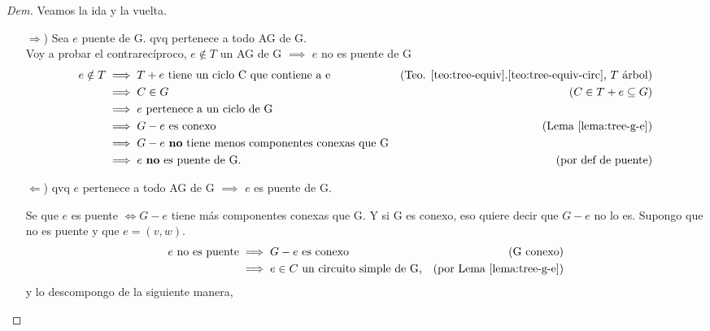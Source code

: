 \documentclass[12pt, a4paper]{report}
\theoremstyle{definition} %
\begin{document}
\begin{proof}[Dem]
    Veamos la ida y la vuelta.

    \begin{enumerate}
        \item[$\Rightarrow$)] Sea $e$ puente de G. qvq pertenece a todo AG de G.\\
         
        Voy a probar el contrarecíproco, $e \notin T$ un AG de G $\implies$ $e$ no es puente de G
        \begin{align*}
            e \notin T &\implies T+e\ \text{tiene un ciclo C que contiene a e} & \text{(Teo. \ref{teo:tree-equiv}.\ref{teo:tree-equiv-circ}, $T$ árbol)}\\
            &\implies C \in G &(C \in T+e \subseteq G)\\
            &\implies e \text{ pertenece a un ciclo de G}\\
            &\implies G - e \text{ es conexo} &\text{(Lema \ref{lema:tree-g-e})}\\
            &\implies G - e \text{ \textbf{no} tiene menos componentes conexas que G}\\
            &\implies e \text{ \textbf{no} es puente de G.} &\text{(por def de puente)}
        \end{align*}

        \item[$\Leftarrow$)] qvq $e$ pertenece a todo AG de G $\implies$ $e$ es puente de G.
         
        Se que $e$ es puente $\iff G - e$ tiene más componentes conexas que G. Y si G es conexo, eso quiere decir que $G - e$ no lo es. Supongo que no es puente y que $e = (v, w)$.
        \begin{align*}
            e\ \text{no es puente} &\implies G - e\ \text{es conexo}    & (\text{G conexo})\\
            &\implies e \in C\ \text{un circuito simple de G,} & (\text{por Lema \ref{lema:tree-g-e}})
        \end{align*}
        y lo descompongo de la siguiente manera,

        \begin{figure}[H]
            \centering
\end{figure}
\end{enumerate}
\end{proof}
\end{document}
